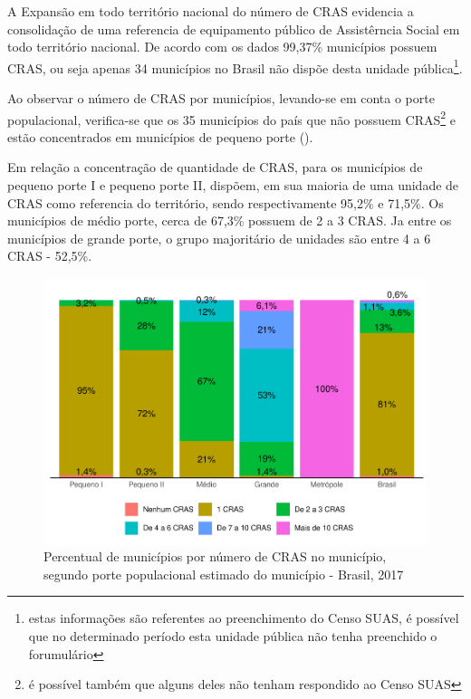 \documentclass[
  brazilian]{report}
\begin{document}
A Expansão em todo território nacional do número de CRAS evidencia a
consolidação de uma referencia de equipamento público de Assistêrncia
Social em todo território nacional. De acordo com os dados 99,37\%
municípios possuem CRAS, ou seja apenas 34 municípios no Brasil não
dispõe desta unidade
pública\footnote{estas informações são referentes ao preenchimento do Censo SUAS, é possível que no determinado período esta unidade pública não tenha preenchido o forumulário}.

Ao observar o número de CRAS por municípios, levando-se em conta o porte
populacional, verifica-se que os 35 municípios do país que não possuem
CRAS\footnote{é possível também que alguns deles não tenham respondido ao Censo SUAS}
e estão concentrados em municípios de pequeno porte
().

Em relação a concentração de quantidade de CRAS, para os municípios de
pequeno porte I e pequeno porte II, dispõem, em sua maioria de uma
unidade de CRAS como referencia do território, sendo respectivamente
95,2\% e 71,5\%. Os municípios de médio porte, cerca de 67,3\% possuem
de 2 a 3 CRAS. Ja entre os municípios de grande porte, o grupo
majoritário de unidades são entre 4 a 6 CRAS - 52,5\%.

\begin{figure}
\includegraphics{Censo-SUAS-2022_files/figure-latex/CRAS-porte-1} \caption[Percentual de municípios por número de CRAS no município, segundo porte populacional estimado do município - Brasil, 2017]{Percentual de municípios por número de CRAS no município, segundo porte populacional estimado do município - Brasil, 2017}\label{fig:CRAS-porte}
\end{figure}
\end{document}
